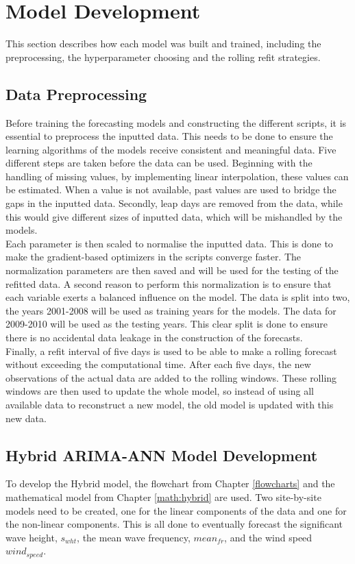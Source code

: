 \newpage

\section{Model Development}
\label{model development}
This section describes how each model was built and trained, including the preprocessing, the hyperparameter choosing and the rolling refit strategies. 

\subsection{Data Preprocessing}
Before training the forecasting models and constructing the different scripts, it is essential to preprocess the inputted data. This needs to be done to ensure the learning algorithms of the models receive consistent and meaningful data. Five different steps are taken before the data can be used. Beginning with the handling of missing values, by implementing linear interpolation, these values can be estimated. When a value is not available, past values are used to bridge the gaps in the inputted data. Secondly, leap days are removed from the data, while this would give different sizes of inputted data, which will be mishandled by the models.\\

\noindent Each parameter is then scaled to normalise the inputted data. This is done to make the gradient-based optimizers in the scripts converge faster. The normalization parameters are then saved and will be used for the testing of the refitted data. A second reason to perform this normalization is to ensure that each variable exerts a balanced influence on the model.
The data is split into two, the years 2001-2008 will be used as training years for the models. The data for 2009-2010 will be used as the testing years. This clear split is done to ensure there is no accidental data leakage in the construction of the forecasts.\\

\noindent Finally, a refit interval of five days is used to be able to make a rolling forecast without exceeding the computational time. After each five days, the new observations of the actual data are added to the rolling windows. These rolling windows are then used to update the whole model, so instead of using all available data to reconstruct a new model, the old model is updated with this new data. 

\subsection{Hybrid ARIMA-ANN Model Development}
To develop the Hybrid model, the flowchart from Chapter \ref{flowcharts} and the mathematical model from Chapter \ref{math:hybrid} are used. Two site-by-site models need to be created, one for the linear components of the data and one for the non-linear components. This is all done to eventually forecast the significant wave height, $s_{wht}$, the mean wave frequency, $mean_{fr}$, and the wind speed $wind_{speed}$.\\ 

